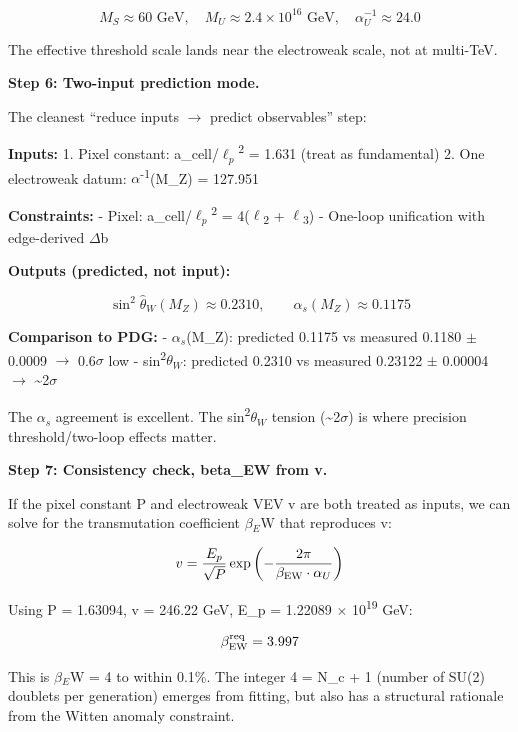 \documentclass[11pt,a4paper]{article}
\theoremstyle{remark}
\begin{document}
\[
M_S \approx 60 \text{ GeV}, \quad M_U \approx 2.4 \times 10^{16} \text{ GeV}, \quad \alpha_U^{-1} \approx 24.0
\]

The effective threshold scale lands near the electroweak scale, not at multi-TeV.

\textbf{Step 6: Two-input prediction mode.}

The cleanest ``reduce inputs \ensuremath{\to} predict observables'' step:

\textbf{Inputs:}
1. Pixel constant: a\_cell/\(\ell_p\)\textsuperscript{2} = 1.631 (treat as fundamental)
2. One electroweak datum: \ensuremath{\alpha}\textsuperscript{-1}(M\_Z) = 127.951

\textbf{Constraints:}
- Pixel: a\_cell/\(\ell_p\)\textsuperscript{2} = 4(\ensuremath{\ell}\textsubscript{2} + \ensuremath{\ell}\textsubscript{3})
- One-loop unification with edge-derived \ensuremath{\Delta}b

\textbf{Outputs (predicted, not input):}

\[
\sin^2\hat{\theta}_W(M_Z) \approx 0.2310, \qquad \alpha_s(M_Z) \approx 0.1175
\]

\textbf{Comparison to PDG:}
- \(\alpha_s\)(M\_Z): predicted 0.1175 vs measured 0.1180 \ensuremath{\pm} 0.0009 \ensuremath{\to} 0.6\ensuremath{\sigma} low
- sin\textsuperscript{2}\(\theta_W\): predicted 0.2310 vs measured 0.23122 \ensuremath{\pm} 0.00004 \ensuremath{\to} \textasciitilde2\ensuremath{\sigma}

The \(\alpha_s\) agreement is excellent. The sin\textsuperscript{2}\(\theta_W\) tension (\textasciitilde2\ensuremath{\sigma}) is where precision threshold/two-loop effects matter.

\textbf{Step 7: Consistency check, beta\_EW from v.}

If the pixel constant P and electroweak VEV v are both treated as inputs, we can solve for the transmutation coefficient \(\beta{}_E\)W that reproduces v:

\[
v = \frac{E_p}{\sqrt{P}} \exp\left(-\frac{2\pi}{\beta_{\rm EW} \cdot \alpha_U}\right)
\]

Using P = 1.63094, v = 246.22 GeV, E\_p = 1.22089 \ensuremath{\times} 10\textsuperscript{19} GeV:

\[
\beta_{\rm EW}^{\rm req} = 3.997
\]

This is \(\beta{}_E\)W = 4 to within 0.1\%. The integer 4 = N\_c + 1 (number of SU(2) doublets per generation) emerges from fitting, but also has a structural rationale from the Witten anomaly constraint.
\end{document}
